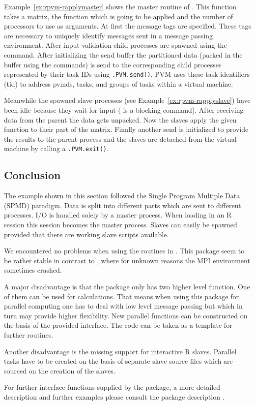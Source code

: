 Example~\ref{ex:rpvm-rapplymaster} shows the
master routine of . This function takes a matrix,
the function which is going to be applied and the number of processors
to use as arguments. At first 
the message tags are specified. These tags are necessary to uniquely
identify messages sent in a message passing environment. After
input validation  child processes are spawned using the
 command. After initializing the send buffer the
partitioned data (packed in the buffer using the 
commands) is send to the corresponding child processes represented by
their task IDs using
\texttt{.PVM.send()}. PVM uses these task identifiers (tid) to
address pvmds, tasks, and groups of tasks within a virtual
machine.

Meanwhile the spawned slave processes (see
Example~\ref{ex:rpvm-rapplyslave}) have been idle because they wait
for input ( is a blocking command). After
receiving data from the parent the data gets unpacked. Now the slaves
apply the given function to their part of the matrix. Finally another
send is initialized to provide the results to the parent process and
the slaves are detached from the virtual machine by calling a
\texttt{.PVM.exit()}. 

\subsection{Conclusion}

The  example shown in this section followed the
Single Program Multiple Data (SPMD) paradigm. Data is split into
different parts which are sent to different processes. I/O is handled
solely by a master
process. When loading  in an R session this session becomes the
master process. Slaves can easily be spawned provided that there are
working slave scripts available.

We encountered no problems when using the routines in . This
package seem to be rather stable in contrast to , where for
unknown reasons the MPI environment sometimes crashed.

A major disadvantage is that the 
package only has two higher level function. One of them can be used
for calculations. That means when using this package for parallel
computing one has 
to deal with low level message passing but which in turn may provide
higher flexibility. New parallel functions can be constructed on the
basis of the provided interface. The  code
can be taken as a template for further routines. 

Another disadvantage is the missing support for interactive R
slaves. Parallel tasks have to be created on the basis of separate
slave source files which are sourced on the creation of the slaves.

For further interface functions supplied by the  package, a more
detailed 
description and further examples please consult the package description
\cite{nali07rpvm}.
